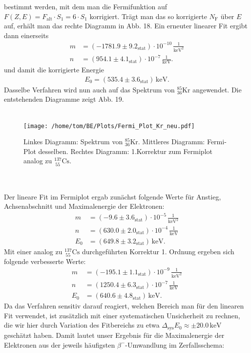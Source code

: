 \documentclass[german,  %
parskip=full,  %
]{scrartcl}
\begin{document}
bestimmt werden, mit dem man die Fermifunktion auf \(F(Z,E) = F_{\mathrm{alt}}\cdot S_1 = 6\cdot S_1\) korrigiert. Trägt man das so korrigierte \(N_{\mathrm{F}}\) über \(E\) auf, erhält man das rechte Diagramm in Abb. 18. Ein erneuter linearer Fit ergibt dann einerseits
\begin{align*}
m &= (-1781.9\pm 9.2_{\mathrm{stat}})\cdot 10^{-10}\,\frac{1}{\mathrm{keV^2}} \\
n &= (954.1\pm 4.1_{\mathrm{stat}})\cdot 10^{-7}\,\frac{1}{\mathrm{keV}}.
\end{align*}
und damit die korrigierte Energie
\begin{align*}
E_0 = (535.4\pm 3.6_{\mathrm{stat}})\,\mathrm{keV}.
\end{align*}
Dasselbe Verfahren wird nun auch auf das Spektrum von \(^{85}_{36}\mathrm{Kr}\) angewendet. Die entstehenden Diagramme zeigt Abb. 19.\\\\
\begin{figure}[h!]\centering
\texttt{[image: /home/tom/BE/Plots/Fermi\_Plot\_Kr\_neu.pdf]}
\caption{Linkes Diagramm: Spektrum von $^{85}_{36}$Kr. Mittleres Diagramm: Fermi-Plot desselben. Rechtes Diagramm: 1.Korrektur zum Fermiplot analog zu \(^{137}_{\ 55}\mathrm{Cs}\).} 
\end{figure}\\\\
Der lineare Fit im Fermiplot ergab zunächst folgende Werte für Anstieg, Achsenabschnitt und Maximalenergie der Elektronen:
\begin{align*}
m &= (-9.6\pm 3.6_{\mathrm{stat}})\cdot 10^{-5}\,\frac{1}{\mathrm{keV^2}} \\
n &= (630.0 \pm 2.0_{\mathrm{stat}})\cdot 10^{-4}\,\frac{1}{\mathrm{keV}} \\
E_0 &= (649.8\pm 3.2_{\mathrm{stat}})\,\mathrm{keV}.
\end{align*}
Mit einer analog zu \(^{137}_{\ 55}\mathrm{Cs}\) durchgeführten Korrektur 1. Ordnung ergeben sich folgende verbesserte Werte:
\begin{align*}
m &= (-195.1\pm 1.1_{\mathrm{stat}})\cdot 10^{-9}\,\frac{1}{\mathrm{keV^2}} \\
n &= (1250.4 \pm 6.3_{\mathrm{stat}})\cdot 10^{-7}\,\frac{1}{\mathrm{keV}} \\
E_0 &= (640.6\pm 4.8_{\mathrm{stat}})\,\mathrm{keV}.
\end{align*}
Da das Verfahren sensitiv darauf reagiert, welchen Bereich man für den linearen Fit verwendet, ist zusätzlich mit einer systematischen Unsicherheit zu rechnen, die wir hier durch Variation des Fitbereichs zu etwa \(\Delta_{\mathrm{sys}} E_0 \approx \pm 20.0\,\mathrm{keV}\) geschätzt haben. Damit lautet unser Ergebnis für die Maximalenergie der Elektronen aus der jeweils häufigsten \(\beta^-\)-Umwandlung im Zerfallsschema:
\end{document}
